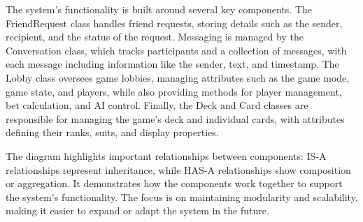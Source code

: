 \noindent The system’s functionality is built around several key components. The FriendRequest class handles friend requests, storing details such as the sender, recipient, and the status of the request. Messaging is managed by the Conversation class, which tracks participants and a collection of messages, with each message including information like the sender, text, and timestamp. The Lobby class oversees game lobbies, managing attributes such as the game mode, game state, and players, while also providing methods for player management, bet calculation, and AI control. Finally, the Deck and Card classes are responsible for managing the game’s deck and individual cards, with attributes defining their ranks, suits, and display properties.

\noindent The diagram highlights important relationships between components: IS-A relationships represent inheritance, while HAS-A relationships show composition or aggregation. It demonstrates how the components work together to support the system's functionality. The focus is on maintaining modularity and scalability, making it easier to expand or adapt the system in the future.
\pagebreak